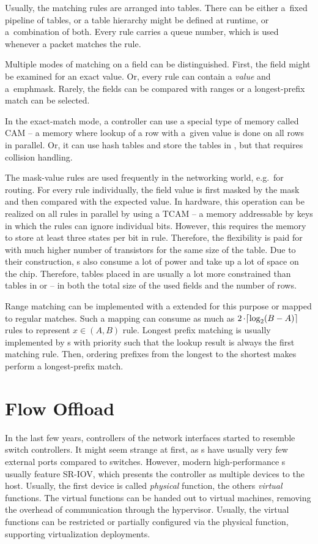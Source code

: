 Usually, the matching rules are arranged into tables. There can be either a~fixed pipeline of
tables, or a table hierarchy might be defined at runtime, or a~combination of
both. Every rule carries a queue number, which is used whenever a packet
matches the rule.

Multiple modes of matching on a field can be distinguished. First, the field
might be examined for an exact value. Or, every rule can contain a \emph{value}
and a~emph{mask}. Rarely, the fields can be compared with ranges or
a longest-prefix match can be selected.

In the exact-match mode, a controller can use a special type of memory called
\acrfull{CAM} -- a memory where lookup of a row with a~given value is done on all
rows in parallel. Or, it can use hash tables and store the tables in ,
but that requires collision handling.

The mask-value rules are used frequently in the networking world, e.g.\ for routing. For every rule
individually, the field value is first masked by the mask and then compared
with the expected value. In hardware, this operation can be realized on all
rules in parallel by using a \acrfull{TCAM} -- a memory addressable by keys in which
the rules can ignore individual bits. However, this requires the memory to store at
least three states per bit in rule. Therefore, the flexibility is paid for with
much higher number of transistors for the same size of the table. Due to their
construction, s also consume a lot of power and take up a lot of space
on the chip. Therefore, tables placed in  are usually a lot more
constrained than tables in  or  -- in both the total size of the
used fields and the number of rows.

Range matching can be implemented with a  extended for this purpose
or mapped to regular  matches. Such a mapping can consume as much as $2
\mathop{\cdot} \lceil \log_2 (B - A) \rceil$  rules to represent $x \in (A,
B)$ rule. Longest prefix matching is usually implemented by s with
priority such that the lookup result is always the first matching rule. Then,
ordering prefixes from the longest to the shortest makes  perform
a longest-prefix match.

\section{Flow Offload}
\label{offload:flow}

In the last few years, controllers of the network interfaces started to resemble
switch controllers. It might seem strange at first, as s have usually
very few external ports compared to switches. However, modern high-performance
s usually feature \acrfull{SR-IOV}, which presents the controller as
multiple  devices to the host. Usually, the first device is called
\emph{physical} function, the others \emph{virtual} functions. The virtual
functions can be handed out to virtual machines, removing the overhead of
communication through the hypervisor. Usually, the virtual functions can be
restricted or partially configured via the physical function, supporting
virtualization deployments.

